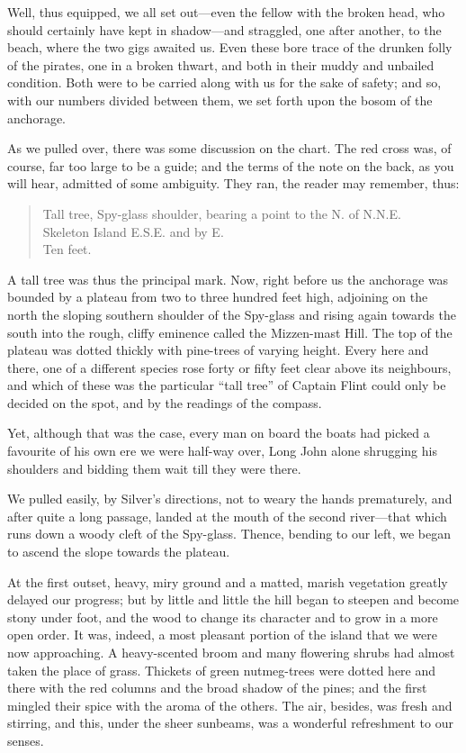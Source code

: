 Well, thus equipped, we all set out---even the fellow with the broken head, who should certainly have kept in shadow---and straggled, one after another, to the beach, where the two gigs awaited us. Even these bore trace of the drunken folly of the pirates, one in a broken thwart, and both in their muddy and unbailed condition. Both were to be carried along with us for the sake of safety; and so, with our numbers divided between them, we set forth upon the bosom of the anchorage.

As we pulled over, there was some discussion on the chart. The red cross was, of course, far too large to be a guide; and the terms of the note on the back, as you will hear, admitted of some ambiguity. They ran, the reader may remember, thus:

\blockquote{Tall tree, Spy-glass shoulder, bearing a point to the N. of N.N.E.\\
Skeleton Island E.S.E. and by E.\\
Ten feet.}

A tall tree was thus the principal mark. Now, right before us the anchorage was bounded by a plateau from two to three hundred feet high, adjoining on the north the sloping southern shoulder of the Spy-glass and rising again towards the south into the rough, cliffy eminence called the Mizzen-mast Hill. The top of the plateau was dotted thickly with pine-trees of varying height. Every here and there, one of a different species rose forty or fifty feet clear above its neighbours, and which of these was the particular \enquote{tall tree} of Captain Flint could only be decided on the spot, and by the readings of the compass.

Yet, although that was the case, every man on board the boats had picked a favourite of his own ere we were half-way over, Long John alone shrugging his shoulders and bidding them wait till they were there.

We pulled easily, by Silver’s directions, not to weary the hands prematurely, and after quite a long passage, landed at the mouth of the second river---that which runs down a woody cleft of the Spy-glass. Thence, bending to our left, we began to ascend the slope towards the plateau.

At the first outset, heavy, miry ground and a matted, marish vegetation greatly delayed our progress; but by little and little the hill began to steepen and become stony under foot, and the wood to change its character and to grow in a more open order. It was, indeed, a most pleasant portion of the island that we were now approaching. A heavy-scented broom and many flowering shrubs had almost taken the place of grass. Thickets of green nutmeg-trees were dotted here and there with the red columns and the broad shadow of the pines; and the first mingled their spice with the aroma of the others. The air, besides, was fresh and stirring, and this, under the sheer sunbeams, was a wonderful refreshment to our senses.


